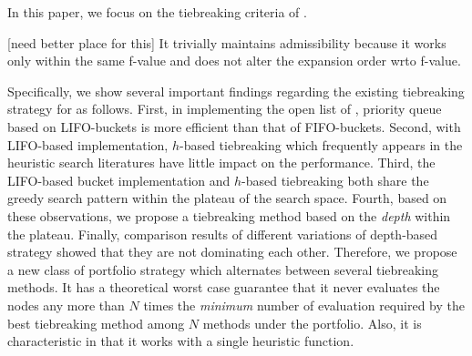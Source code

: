 % 

In this paper, we focus on the tiebreaking criteria of \astar.

[need better place for this] It trivially maintains admissibility because it works only within the
same f-value and does not alter the expansion order wrto f-value.




Specifically, we show several important findings regarding the
existing tiebreaking strategy for \astar as follows.
% 
First, in implementing the open list of \astar, priority queue based on
LIFO-buckets is more efficient than that of FIFO-buckets.
% 
Second, with LIFO-based implementation, $h$-based tiebreaking which
frequently appears in the heuristic search literatures have little
impact on the performance.
% 
Third, the LIFO-based bucket implementation and $h$-based tiebreaking
both share the greedy search pattern within the plateau of the
search space.
% 
Fourth, based on these observations, we propose a tiebreaking
method based on the \emph{depth} within the plateau.
%
Finally, comparison results of different variations of depth-based
strategy showed that they are not dominating each other. Therefore, we
propose a new class of portfolio strategy which alternates between
several tiebreaking methods.
It has a theoretical worst case guarantee that it
never evaluates the nodes any more than $N$ times the \emph{minimum} number
of evaluation required by the best tiebreaking method among $N$ methods
under the portfolio.
Also, it is characteristic in that it works with a single heuristic function.
% 

